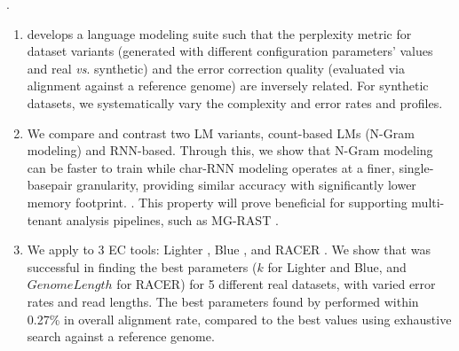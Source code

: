 . 
\vspace{-6pt}
\begin{enumerate}
\item \name develops a language modeling suite such that the perplexity metric for dataset variants (generated with different configuration parameters' values and real \textit{vs}. synthetic) and the error correction quality (evaluated via alignment against a reference genome) are inversely related. For synthetic datasets, we systematically vary the complexity and error rates and profiles. 
\vspace{-8pt}

\item We compare and contrast two LM variants, count-based LMs (N-Gram modeling) and RNN-based. Through this, we show that N-Gram modeling can be faster to train while char-RNN modeling operates at a finer, single-basepair granularity, providing similar accuracy with significantly lower memory footprint. 
.
This property will prove beneficial for supporting multi-tenant analysis pipelines, such as MG-RAST \cite{meyer2017mg}.
\vspace{-8pt}

\item We apply \name to 3 EC tools: Lighter \cite{song2014lighter}, Blue \cite{greenfield2014blue}, and RACER \cite{ilie2013racer}. We show that \name was successful in finding the best parameters ($k$ for Lighter and Blue, and $Genome Length$ for RACER) for 5 different real datasets, with varied error rates and read lengths. The best parameters found by \name performed within 0.27\% in overall alignment rate, compared to the best values using exhaustive search against a reference genome.

\end{enumerate}



